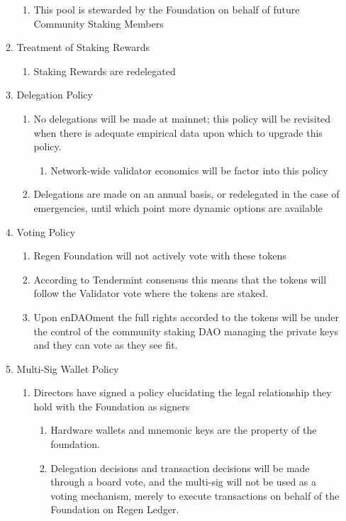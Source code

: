 \documentclass{article}
\begin{document}
\begin{enumerate}
\begin{enumerate}
\begin{enumerate}
\item This pool is stewarded by the Foundation on behalf of future Community Staking Members
\end{enumerate}
\item Treatment of Staking Rewards
\begin{enumerate}
\item Staking Rewards are redelegated
\end{enumerate}
\item Delegation Policy
\begin{enumerate}
\item No delegations will be made at mainnet; this policy will be revisited when there is adequate empirical data upon which to upgrade this policy.
\begin{enumerate}
\item Network-wide validator economics will be factor into this policy
\end{enumerate}
\item Delegations are made on an annual basis, or redelegated in the case of emergencies, until which point more dynamic options are available
\end{enumerate}
\item Voting Policy
\begin{enumerate}
\item Regen Foundation will not actively vote with these tokens
\item According to Tendermint consensus this means that the tokens will follow the Validator vote where the tokens are staked.  
\item Upon enDAOment the full rights accorded to the tokens will be under the control of the community staking DAO managing the private keys and they can vote as they see fit.
\end{enumerate}
\item Multi-Sig Wallet Policy
\begin{enumerate}
\item Directors have signed a policy elucidating the legal relationship they hold with the Foundation as signers
\begin{enumerate}
\item Hardware wallets and mnemonic keys are the property of the foundation.
\item Delegation decisions and transaction decisions will be made through a board vote, and the multi-sig will not be used as a voting mechanism, merely to execute transactions on behalf of the Foundation on Regen Ledger.

\end{enumerate}
\end{enumerate}
\end{enumerate}
\end{enumerate}
\end{document}
